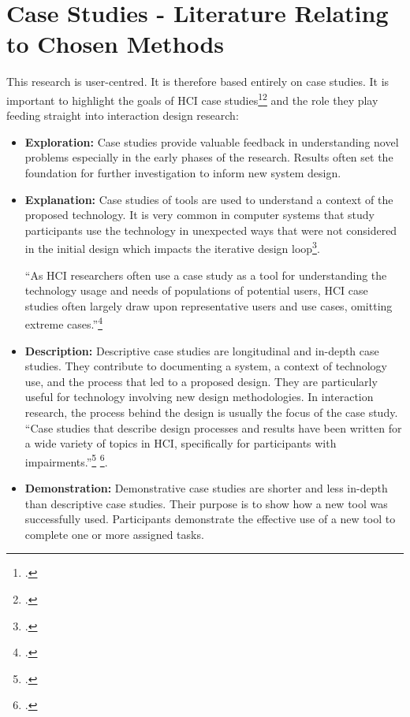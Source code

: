 \chapter{Case Studies - Literature Relating to Chosen Methods}

This research is user-centred. It is therefore based entirely on case studies. It is important to highlight the goals of HCI case studies\footcite{Lazar2010}\footcite{Cox2008} and the role they play feeding straight into interaction design research:

\begin{itemize}
    \item \textbf{Exploration:} Case studies provide valuable feedback in understanding novel problems especially in the early phases of the research.  Results often set the foundation for further investigation to inform new system design.
    
    \item \textbf{Explanation:} Case studies of tools are used to understand a context of the proposed technology.  It is very common in computer systems that study participants use the technology in unexpected ways that were not considered in the initial design which impacts the iterative design loop\footcite{Klasnja2011}.
    
    ``As HCI researchers often use a case study as a tool for understanding the technology usage and needs of populations of potential users, HCI case studies often largely draw upon representative users and use cases, omitting extreme cases.''\footcite{Lazar2010}
    
    \item \textbf{Description:} Descriptive case studies are longitudinal and in-depth case studies.  They contribute to documenting a system, a context of technology use, and the process that led to a proposed design. They are particularly useful for technology involving new design methodologies. In interaction  research, the process behind the design is usually the focus of the case study.  ``Case studies that describe design processes and results have been written for a wide variety of topics in HCI, specifically for participants with impairments.''\footcite{Lazar2010} \footcite{Cox2008}.
    
    \item \textbf{Demonstration:} Demonstrative case studies are shorter and less in-depth than descriptive case studies.  Their purpose is to show how a new tool was successfully used.  Participants demonstrate the effective use of a new tool to complete one or more assigned tasks. 
\end{itemize}   

